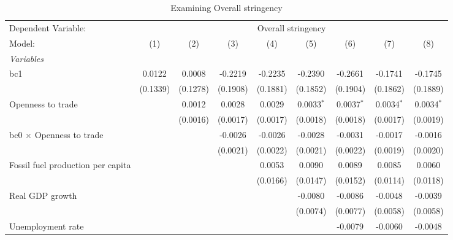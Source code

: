 
\begin{table}[htbp]
   \caption{Examining Overall stringency}
   \centering
   \begin{tabular}{lcccccccc}
      \tabularnewline \midrule \midrule
      Dependent Variable: & \multicolumn{8}{c}{Overall stringency}\\
      Model:                                  & (1)      & (2)      & (3)      & (4)      & (5)          & (6)          & (7)          & (8)\\  
      \midrule
      \emph{Variables}\\
      bc1                                     & 0.0122   & 0.0008   & -0.2219  & -0.2235  & -0.2390      & -0.2661      & -0.1741      & -0.1745\\   
                                              & (0.1339) & (0.1278) & (0.1908) & (0.1881) & (0.1852)     & (0.1904)     & (0.1862)     & (0.1889)\\   
      Openness to trade                       &          & 0.0012   & 0.0028   & 0.0029   & 0.0033$^{*}$ & 0.0037$^{*}$ & 0.0034$^{*}$ & 0.0034$^{*}$\\   
                                              &          & (0.0016) & (0.0017) & (0.0017) & (0.0018)     & (0.0018)     & (0.0017)     & (0.0019)\\   
      bc0 $\times$ Openness to trade          &          &          & -0.0026  & -0.0026  & -0.0028      & -0.0031      & -0.0017      & -0.0016\\   
                                              &          &          & (0.0021) & (0.0022) & (0.0021)     & (0.0022)     & (0.0019)     & (0.0020)\\   
      Fossil fuel production per capita       &          &          &          & 0.0053   & 0.0090       & 0.0089       & 0.0085       & 0.0060\\   
                                              &          &          &          & (0.0166) & (0.0147)     & (0.0152)     & (0.0114)     & (0.0118)\\   
      Real GDP growth                         &          &          &          &          & -0.0080      & -0.0086      & -0.0048      & -0.0039\\   
                                              &          &          &          &          & (0.0074)     & (0.0077)     & (0.0058)     & (0.0058)\\   
      Unemployment rate                       &          &          &          &          &              & -0.0079      & -0.0060      & -0.0048\\   

\end{tabular}
\end{table}
